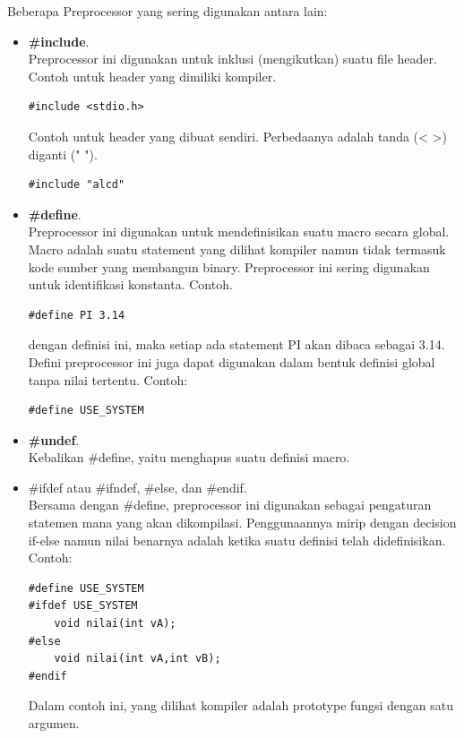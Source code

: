 \documentclass[12pt,]{article}
\begin{document}
	Beberapa Preprocessor yang sering digunakan antara lain:
	\begin{itemize}
		\item \textbf{\#include}. \\
		Preprocessor ini digunakan untuk inklusi (mengikutkan) suatu file header.
		Contoh untuk header yang dimiliki kompiler.
		\begin{verbatim}
#include <stdio.h>
		\end{verbatim}
		
		Contoh untuk header yang dibuat sendiri.
		Perbedaanya adalah tanda (< >) diganti (" ").
		\begin{verbatim}
#include "alcd"
		\end{verbatim}
		
		\item \textbf{\#define}. \\
		Preprocessor ini digunakan untuk mendefinisikan suatu macro secara global.
		Macro adalah suatu statement yang dilihat kompiler namun tidak termasuk kode sumber yang membangun binary.
		Preprocessor ini sering digunakan untuk identifikasi konstanta.
		Contoh.
		\begin{verbatim}
#define PI 3.14
		\end{verbatim}
		dengan definisi ini, maka setiap ada statement PI akan dibaca sebagai 3.14.
		Defini preprocessor ini juga dapat digunakan dalam bentuk definisi global tanpa nilai tertentu.
		Contoh:
		\begin{verbatim}
#define USE_SYSTEM
		\end{verbatim}
		
		\item \textbf{\#undef}. \\
		Kebalikan \#define, yaitu menghapus suatu definisi macro.
		
		\item \#ifdef atau \#ifndef, \#else, dan \#endif. \\
		Bersama dengan \#define, preprocessor ini digunakan sebagai pengaturan statemen mana yang akan dikompilasi.
		Penggunaannya mirip dengan decision if-else namun nilai benarnya adalah ketika suatu definisi telah didefinisikan.
		Contoh:
		\begin{verbatim}
#define USE_SYSTEM
#ifdef USE_SYSTEM
	void nilai(int vA);
#else
	void nilai(int vA,int vB);
#endif
		\end{verbatim}
		Dalam contoh ini, yang dilihat kompiler adalah prototype fungsi dengan satu argumen.
		

\end{itemize}
\end{document}
